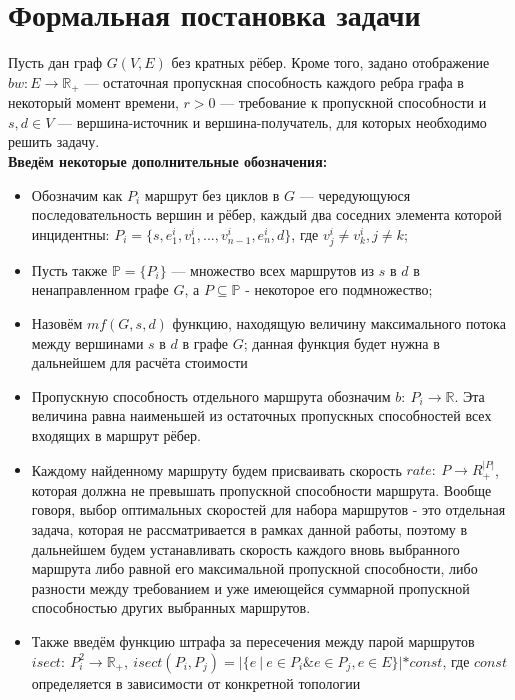 \documentclass[a4paper]{article}
\begin{document}
\section{Формальная постановка задачи}
Пусть дан граф $G(V, E)$ без кратных рёбер. Кроме того, задано отображение $bw: E \to \mathbb{R}_+$ --- остаточная пропускная способность каждого ребра графа в некоторый момент времени, $r>0$ --- требование к пропускной способности и $s, d \in V$ --- вершина-источник и вершина-получатель, для которых необходимо решить задачу.\\
\textbf{Введём некоторые дополнительные обозначения:}
\begin{itemize}

\item Обозначим как $P_i$ маршрут без циклов в $G$ --- чередующуюся последовательность вершин и рёбер, каждый два соседних элемента которой инцидентны: $P_i = \{s, e^i_1, v^i_1, ..., v^i_{n-1}, e^i_n, d\}$, где $v^i_j \ne v^i_k, j \ne k$;

\item Пусть также $\mathbb{P} = \{P_i\}$ --- множество всех маршрутов из $s$ в $d$ в ненаправленном графе $G$, а $P \subseteq \mathbb{P}$ - некоторое его подмножество;

\item Назовём $mf(G, s, d)$ функцию, находящую величину максимального потока между вершинами $s$ в $d$ в графе $G$; данная функция будет нужна в дальнейшем для расчёта стоимости

\item Пропускную способность отдельного маршрута обозначим $b:\ P_i \to \mathbb{R}$. Эта величина равна наименьшей из  остаточных пропускных способностей всех входящих в маршрут рёбер.

\item Каждому найденному маршруту будем присваивать скорость $rate:\  P \to R^{|P|}_+$, которая должна не превышать пропускной способности маршрута. Вообще говоря, выбор оптимальных скоростей для набора маршрутов - это отдельная задача, которая не рассматривается в рамках данной работы, поэтому в дальнейшем будем устанавливать скорость каждого вновь выбранного маршрута либо равной его максимальной пропускной способности, либо разности между требованием и уже имеющейся суммарной пропускной способностью других выбранных маршрутов.

\item Также введём функцию штрафа за пересечения между парой маршрутов $isect:\ P_i^2 \to \mathbb{R}_+,\ isect(P_i, P_j) = |\{e\ |\ e \in P_i \& e \in P_j, e \in E\}|*const$, где $const$ определяется в зависимости от конкретной топологии


\end{itemize}
\end{document}
